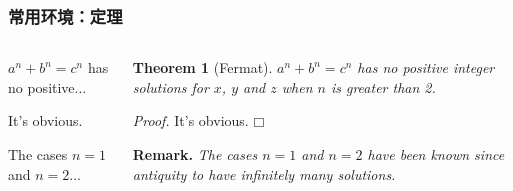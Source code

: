 \begin{frame}[fragile]
\frametitle{常用环境：定理}
\begin{columns}
\begin{column}{0.6\textwidth}
  \begin{texcode}[gobble=4, moredelim={[is][emphstyle]{!}{!}}, moretexcs={\newtheorem*},
      emph={[2]amsthm}]
    \usepackage{amsthm}
    \newtheorem{theorem}{Theorem}
    \newtheorem*{remark}{Remark} %

    \begin{!theorem!}[Fermat]
      $a^n+b^n=c^n$ has no positive...
    \end{!theorem!}
    \begin{!proof!}
      It's obvious.
    \end{!proof!}
    \begin{!remark!}
      The cases $n=1$ and $n=2$...
    \end{!remark!}
  \end{texcode}
\end{column}
\pause
\begin{column}{0.32\textwidth}
  \footnotesize\RaggedRight
  \setlength{\parskip}{0.5em}
  \setlength{\parindent}{0pt}

  \textbf{Theorem 1} (Fermat). \textit{$a^n+b^n=c^n$ has no positive integer solutions
    for $x$, $y$ and $z$ when $n$ is greater than 2.}

  \textit{Proof.} It's obvious. \hfill $\mdlgwhtsquare$

  \textbf{Remark.} \textit{The cases $n=1$ and $n=2$ have been known since antiquity
    to have infinitely many solutions.}
\end{column}
\end{columns}
\end{frame}

